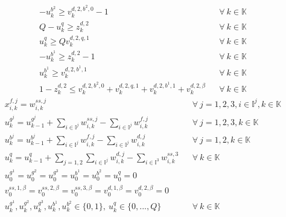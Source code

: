 \documentclass[]{interact}
\theoremstyle{plain}%
\theoremstyle{definition}
\theoremstyle{remark}
\begin{document}
\begin{eqnarray}
-u^{b^2}_k\ge v^{d,2,b^2,0}_k-1&& \forall\ k\in \mathbb{K}\label{merge:d2,2}\\
Q-u^{q}_k\ge z^{d,2}_k&& \forall\ k\in \mathbb{K}\label{merge:d2,3}\\
u^{q}_k\ge Qv^{d,2,q,1}_k&& \forall\ k\in \mathbb{K}\label{merge:d2,4}\\
-u^{b^1}_k\ge z^{d,2}_k-1&& \forall\ k\in \mathbb{K}\label{merge:d2,5}\\
u^{b^1}_k\ge v^{d,2,b^1,1}_k&& \forall\ k\in \mathbb{K}\label{merge:d2,6}\\
1-z^{d,2}_k\le v^{d,2,b^2,0}_k+v^{d,2,q,1}_k+v^{d,2,b^1,1}_k+v^{d,2,\beta}_k&& \forall\ k\in \mathbb{K}\label{merge:d2,7}
\end{eqnarray}
\begin{eqnarray}
x^{f,j}_{i,k} = w^{ss,j}_{i,k} && \forall\ j=1,2,3, i\in \mathbb{I}^{j},k\in \mathbb{K}\label{merge:f,1}\\
u^{g^j}_k=u^{g^j}_{k-1}+ \sum_{i\in\mathbb{I}^j}w^{ss,j}_{i,k}-\sum_{i\in\mathbb{I}^j}w^{f,j}_{i,k}&& \forall\ j=1,2,3, k\in \mathbb{K}\label{merge:E_wj}\\
u^{b^j}_k=u^{b^j}_{k-1}+ \sum_{i\in\mathbb{I}^j}w^{f,j}_{i,k}-\sum_{i\in\mathbb{I}^j}w^{d,j}_{i,k}&& \forall\ j=1,2, k\in \mathbb{K}\label{merge:E_bj}\\
u^{q}_k=u^{q}_{k-1}+\sum_{j=1,2}\sum_{i\in\mathbb{I}^j}w^{d,j}_{i,k}-\sum_{i\in\mathbb{I}^3}w^{ss,3}_{i,k}&& \forall\ k\in \mathbb{K}\label{merge:E_q}\\
u^{g^1}_0=u^{g^2}_0=u^{g^3}_0=u^{b^1}_0=u^{b^2}_0=u^{q}_0=0\nonumber\\
v^{ss,1,\beta}_0=v^{ss,2,\beta}_0=v^{ss,3,\beta}_0=v^{d,1,\beta}_0=v^{d,2,\beta}_0=0\nonumber\\
u^{g^1}_{k},u^{g^2}_{k},u^{g^3}_{k},u^{b^1}_{k},u^{b^2}_{k}\in\{0,1\},\ u^q_{k}\in\{0,...,Q\}&& \forall\ k\in \mathbb{K}\nonumber
\end{eqnarray}
\end{document}
